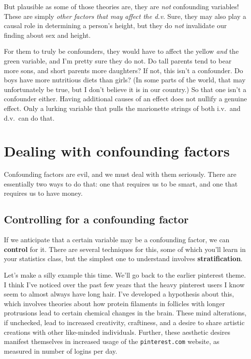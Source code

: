 But plausible as some of those theories are, they are \textit{not} confounding
variables! These are simply \textit{other factors that may affect the d.v.}
Sure, they may also play a causal role in determining a person's height, but
they do \textit{not} invalidate our finding about sex and height.

For them to truly be confounders, they would have to affect the yellow
\textit{and} the green variable, and I'm pretty sure they do not. Do tall
parents tend to bear more sons, and short parents more daughters? If not, this
isn't a confounder. Do boys have more nutritious diets than girls? (In some
parts of the world, that may unfortunately be true, but I don't believe it is
in our country.) So that one isn't a confounder either. Having additional
causes of an effect does not nullify a genuine effect. Only a lurking variable
that pulls the marionette strings of both i.v.~and d.v.~can do that.

\section{Dealing with confounding factors}


\label{smart}
Confounding factors are evil, and we must deal with them seriously. There are
essentially two ways to do that: one that requires us to be smart, and one that
requires us to have money.

\subsection{Controlling for a confounding factor}


If we anticipate that a certain variable may be a confounding factor, we can
\textbf{control} for it. There are several techniques for this, some of which
you'll learn in your statistics class, but the simplest one to understand
involves \textbf{stratification}.


Let's make a silly example this time. We'll go back to the earlier pinterest
theme. I think I've noticed over the past few years that the heavy pinterest
users I know seem to almost always have long hair. I've developed a hypothesis
about this, which involves theories about how protein filaments in follicles
with longer protrusions lead to certain chemical changes in the brain. These
mind alterations, if unchecked, lead to increased creativity, craftiness, and a
desire to share artistic creations with other like-minded individuals. Further,
these aesthetic desires manifest themselves in increased usage of the
\texttt{pinterest.com} website, as measured in number of logins per day.

